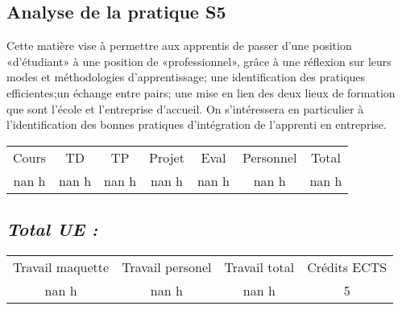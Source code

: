 \subsection{Analyse de la pratique S5}%
\label{subsec:AnalysedelapratiqueS5}%

%
Cette matière vise à permettre aux apprentis de passer d’une position «d’étudiant» à une position de «professionnel», grâce à une réflexion sur leurs modes et méthodologies d’apprentissage; une identification des pratiques efficientes;un échange entre pairs; une mise en lien des deux lieux de formation que sont l’école et l’entreprise d’accueil. On s'intéressera en particulier à l'identification des bonnes pratiques d'intégration de l’apprenti en entreprise.%
\begin{longtable}{c c c c c c c}%
\hline%
Cours&TD&TP&Projet&Eval&Personnel&Total\\%
nan h&nan h&nan h&nan h&nan h&nan h&nan h\\%
\hline%
\end{longtable}%
\subsection{\textit{Total UE :}}%
\label{subsec:textitTotalUE}%

%
\begin{longtable}{c c c c}%
\hline%
Travail maquette&Travail personel&Travail total&Crédits ECTS\\%
nan h&nan h&nan h&5\\%
\hline%
\end{longtable}